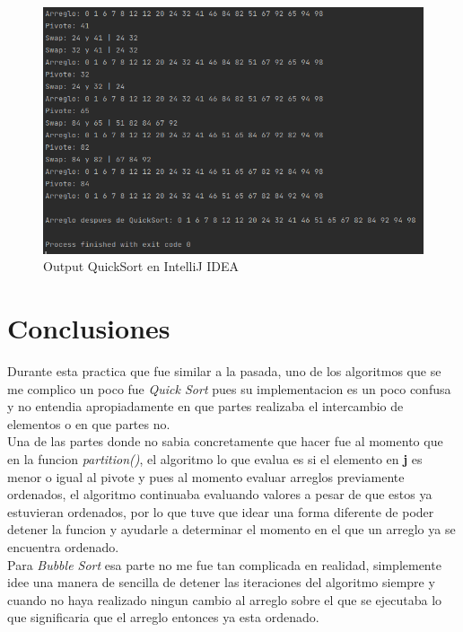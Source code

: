 \documentclass{article}
\begin{document}
		\begin{figure}[H]
			\centering
			\includegraphics[scale = 0.65]{images/e54.png}
			\caption{Output QuickSort en IntelliJ IDEA}
		\end{figure}
	\newpage		
		
	\section{Conclusiones}
	
	Durante esta practica que fue similar a la pasada, uno de los algoritmos que se me complico un poco fue \emph{Quick Sort} pues su implementacion es un poco confusa y no entendia apropiadamente en que partes realizaba el intercambio de elementos o en que partes no.\\
	
	Una de las partes donde no sabia concretamente que hacer fue al momento que en la funcion \emph{partition()}, el algoritmo lo que evalua es si el elemento en \textbf{j} es menor o igual al pivote y pues al momento evaluar arreglos previamente ordenados, el algoritmo continuaba evaluando valores a pesar de que estos ya estuvieran ordenados, por lo que tuve que idear una forma diferente de poder detener la funcion y ayudarle a determinar el momento en el que un arreglo ya se encuentra ordenado.\\
	
	Para \emph{Bubble Sort} esa parte no me fue tan complicada en realidad, simplemente idee una manera de sencilla de detener las iteraciones del algoritmo siempre y cuando no haya realizado ningun cambio al arreglo sobre el que se ejecutaba lo que significaria que el arreglo entonces ya esta ordenado.\\
	
\end{document}
